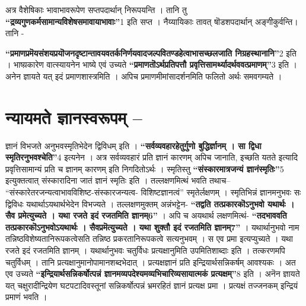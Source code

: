 अत्र वैशेषिकाः भावाभावरूपेण सप्तपदार्थान् निरूपयन्ति । तानि तु \textbf{“द्रव्यगुणकर्मसामान्यविशेषसमावायाभावाः”}1 इति सप्त । नैय्यायिकाः तावत् षॊडशपदार्थान् अङ्गीकुर्वन्ति। तानि -

\textbf{“प्रमाणप्रमॆयसंशयप्रयॊजनदृष्टान्तावयवतर्कनिर्णयवादजल्पवितण्डहेत्वाभासच्छलजाति निग्रहस्थानानि”}2 इति । भाष्य़कारेण वात्स्यायनेन भाष्ये एवं उच्यते \textbf{“प्रमाणतॊऽर्थप्रतिपत्तौ प्रवृत्तिसामर्थ्यादर्थववत्प्रमाणम्”}3 इति । अनेन ज्ञायते यत् इदं प्रमाणशास्त्रमिति । अपिच प्रमाणमीमांसादर्शनमिति फलितो अर्थः समवगम्यते ।

\section*{न्यायमते ज्ञानस्वरूपम् –}

ज्ञानं विभजते अनुभवस्मृतिभेदेन द्विविधम् इति । \textbf{“सर्वव्यवहारहेतुर्गुणो बुद्धिर्ज्ञानम् । सा द्विधा स्मृतिरनुभवश्चेति”}4 इत्यनेन । अत्र सर्वव्यवहारं प्रति ज्ञानं कारणम् अपिच जानाति, इच्छति यतते इत्यादि प्रवृत्तिसामान्यं प्रति च ज्ञानम् कारणम् इति निगदितोऽर्थः । स्मृतिस्तु \textbf{“संस्कारमात्रजन्यं ज्ञानंस्मृतिः”}5 इत्युक्तत्वात् संस्कारादिना जातं ज्ञानं स्मृतिः इति । तल्लक्षणमित्थं भवति तथाच– “संस्कारेतरजन्यत्वाभावविशिष्ट-संस्कारजन्यत्व- विशिष्टज्ञानत्वं” स्मृतेर्लक्षणम् । स्मृतिभिन्नं ज्ञानमनुभवः सः द्विविधः यथार्थाऽयथार्थभेदेन विभज्यते । तल्लक्षणमुक्तम् अन्नंभट्टेन- \textbf{“तद्वति तत्प्रकारकॊऽनुभवो यथार्थः । सैव प्रमेत्युच्यते । यथा रजते इदं रजतमिति ज्ञानम्6”} । अपि च अयथार्थ लक्षणमित्थं- \textbf{“तदभाववति तत्प्रकारकॊऽनुभवोऽयथार्थः । सैवप्रमॆत्युच्यते । यथा शुक्तौ इदं रजतमिति ज्ञानम्7”} । यथार्थानुभवो नाम तन्निष्ठविशेष्यतानिरूपकत्वेसति तन्निष्ठ प्रकरतानिरूपकत्वे सत्यनुभवम् । स एव प्रमा इत्यप्युच्यते । यथा रजते इदं रजतमिति ज्ञानम् । यथार्थानुभवः चतुर्विधः प्रत्यक्षानुमिति उपमितिशाब्दाः इति । तत्करणमपि चतुर्विधम् । तानि प्रत्यक्षानुमानोपामानशब्दभेदात् । प्रत्यक्षज्ञानं प्रति इन्द्रियार्थसन्निकर्षम् आवश्यकः । अत एव उच्यते \textbf{“इन्द्रियार्थसन्निकर्षोत्पन्नं ज्ञानमव्यपदेश्यमव्यभिचारिव्यसायात्मकं प्रत्यक्षम्”}8 इति । अनॆन ज्ञायते यत् चक्षुरादीन्द्रियेण घटपटादिवस्तूनां सन्निकर्षोत्पन्नं भ्रमरहितं ज्ञानं प्रत्यक्ष प्रमा । प्रत्यक्षं तज्जनकम् इन्द्रियं प्रमाणं भवति ।

